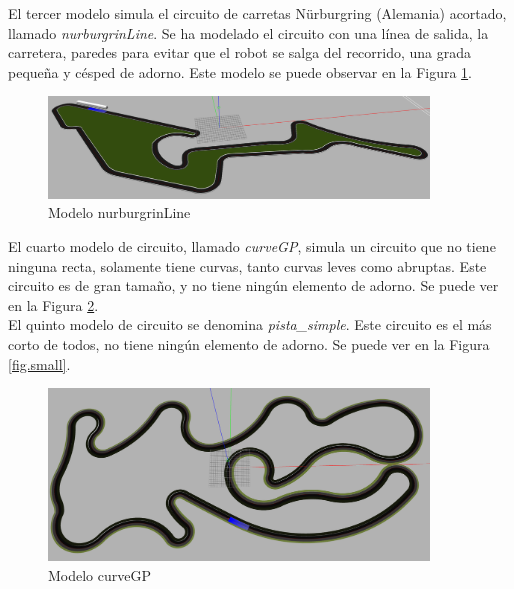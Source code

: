 El tercer modelo simula el circuito de carretas Nürburgring (Alemania) acortado, llamado \textit{nurburgrinLine}. Se ha modelado el circuito con una línea de salida, la carretera, paredes para evitar que el robot se salga del recorrido, una grada pequeña y césped de adorno. Este modelo se puede observar en la Figura \ref{fig.nurburgrin}.\\

\begin{figure}
  \begin{center}
    \includegraphics[width=0.9\textwidth]{figures/Infraestructura/circuit_Nurburgrin.png}
		\caption{Modelo nurburgrinLine}
		\label{fig.nurburgrin}
		\end{center}
\end{figure}

El cuarto modelo de circuito, llamado \textit{curveGP}, simula un circuito que no tiene ninguna recta, solamente tiene curvas, tanto curvas leves como abruptas. Este circuito es de gran tamaño, y no tiene ningún elemento de adorno. Se puede ver en la Figura \ref{fig.curveGP}.\\

El quinto modelo de circuito se denomina \textit{pista\_simple}. Este circuito es el más corto de todos, no tiene ningún elemento de adorno. Se puede ver en la Figura \ref{fig.small}.\\


\begin{figure}[H]
  \begin{center}
    \includegraphics[width=0.9\textwidth]{figures/Infraestructura/circuit_CurveGP.png}
		\caption{Modelo curveGP}
		\label{fig.curveGP}
		\end{center}
\end{figure}


